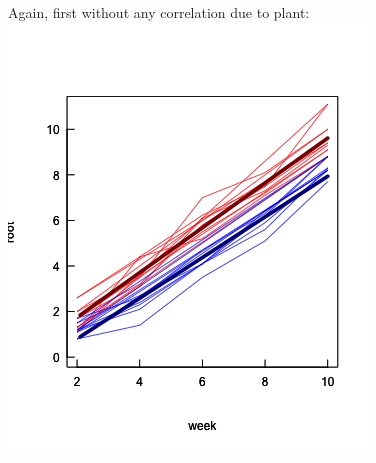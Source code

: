 \documentclass{beamer}
\newenvironment{VerbatimOUT}
 {\VerbatimEnvironment
  \begin{tcolorbox}[
    breakable,
    spartan
  ]%
  \begin{Verbatim}}
 {\end{Verbatim}\end{tcolorbox}}
\begin{document}
\begin{frame}[fragile]{}
\begin{columns}
    \begin{column}{0.3\textwidth}
    Again, first without any correlation due to plant:
    \includegraphics[width=\textwidth]{lectures/day_4_GLS/figures/unnamed-chunk-32-1.png}    
    \end{column}
\end{columns}
\end{frame}
\end{document}
